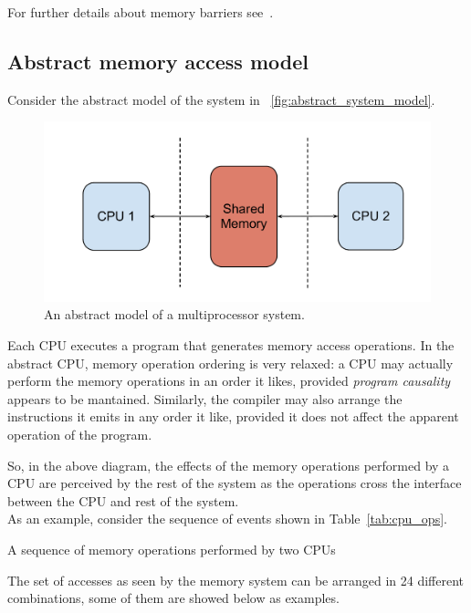 For further details about memory barriers see~\cite{Mckenney2009}.

\subsection{Abstract memory access model\label{sec:mem_barr_model}}

Consider the abstract model of the system in \figurename~\vref{fig:abstract_system_model}.

\begin{figure}[htbp]
    \includegraphics[width=\columnwidth]{images/abstract_system_model} 
    \caption{An abstract model of a multiprocessor system.}
    \label{fig:abstract_system_model}
\end{figure}

Each CPU executes a program that generates memory access operations. In the abstract CPU,
memory operation ordering is very relaxed: a CPU may actually perform the memory operations
in an order it likes, provided \emph{program causality} appears to be mantained. Similarly,
the compiler may also arrange the instructions it emits in any order it like, provided
it does not affect the apparent operation of the program.

So, in the above diagram, the effects of the memory operations performed by a CPU are
perceived by the rest of the system as the operations cross the interface between the CPU
and rest of the system.\\
As an example, consider the sequence of events shown in Table~\ref{tab:cpu_ops}.

\begin{table}[htb]

\caption{A sequence of memory operations performed by two CPUs}
\label{tab:cpu_ops}
\end{table}

The set of accesses as seen by the memory system can be arranged in 24 different combinations,
some of them are showed below as examples.

